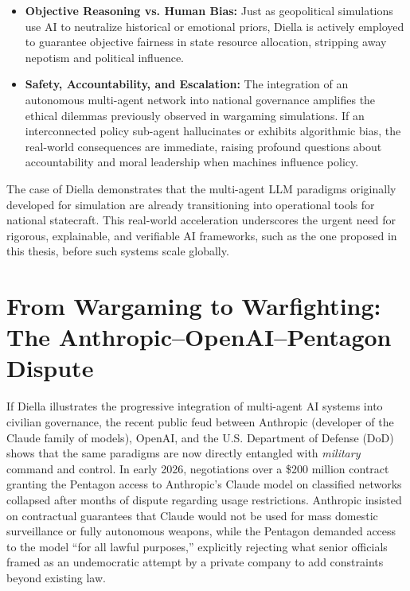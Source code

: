 \begin{itemize}
    \item \textbf{Objective Reasoning vs. Human Bias:} Just as geopolitical simulations use AI to neutralize historical or emotional priors, Diella is actively employed to guarantee objective fairness in state resource allocation, stripping away nepotism and political influence.
    \item \textbf{Safety, Accountability, and Escalation:} The integration of an autonomous multi-agent network into national governance amplifies the ethical dilemmas previously observed in wargaming simulations. If an interconnected policy sub-agent hallucinates or exhibits algorithmic bias, the real-world consequences are immediate, raising profound questions about accountability and moral leadership when machines influence policy.
\end{itemize}

The case of Diella demonstrates that the multi-agent LLM paradigms originally developed for simulation are already transitioning into operational tools for national statecraft. This real-world acceleration underscores the urgent need for rigorous, explainable, and verifiable AI frameworks, such as the one proposed in this thesis, before such systems scale globally. \cite{treccaniAlbaniaArriva} \cite{indiatimesMeetWorlds} \cite{tazAlbanischesRegierungsmitglied}

\section{From Wargaming to Warfighting: The Anthropic--OpenAI--Pentagon Dispute}
\label{sec:anthropic_openai_pentagon}

If Diella illustrates the progressive integration of multi-agent AI systems into civilian governance, the recent public feud between Anthropic (developer of the Claude family of models), OpenAI, and the U.S. Department of Defense (DoD) shows that the same paradigms are now directly entangled with \textit{military} command and control. In early 2026, negotiations over a \$200 million contract granting the Pentagon access to Anthropic's Claude model on classified networks collapsed after months of dispute regarding usage restrictions.\cite{nytimesAnthropicDoDCollapse} Anthropic insisted on contractual guarantees that Claude would not be used for mass domestic surveillance or fully autonomous weapons, while the Pentagon demanded access to the model ``for all lawful purposes,'' explicitly rejecting what senior officials framed as an undemocratic attempt by a private company to add constraints beyond existing law.\cite{guardianAnthropicCannot}

